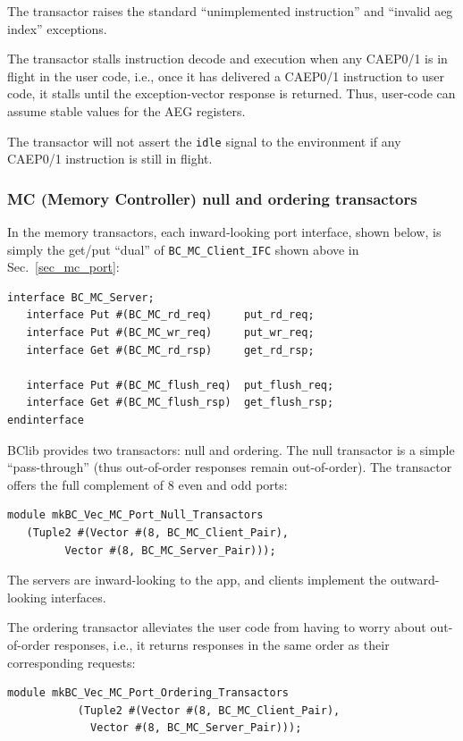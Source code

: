 \documentclass[twoside,letterpaper,11pt]{article}
\begin{document}
The transactor raises the standard ``unimplemented instruction'' and
``invalid aeg index'' exceptions.

The transactor stalls instruction decode and execution when any
CAEP0/1 is in flight in the user code, i.e., once it has delivered a
CAEP0/1 instruction to user code, it stalls until the exception-vector
response is returned.  Thus, user-code can assume stable values for
the AEG registers.

The transactor will not assert the \verb|idle| signal to the
environment if any CAEP0/1 instruction is still in flight.


\subsubsection{MC (Memory Controller) null and ordering transactors}

\label{sec_mc_transactors}

In the memory transactors, each inward-looking port interface, shown
below, is simply the get/put ``dual'' of \verb|BC_MC_Client_IFC| shown
above in Sec.~\ref{sec_mc_port}:
\begin{Verbatim}[frame=single, label=BC\_Transactors.bsv]
interface BC_MC_Server;
   interface Put #(BC_MC_rd_req)     put_rd_req;
   interface Put #(BC_MC_wr_req)     put_wr_req;
   interface Get #(BC_MC_rd_rsp)     get_rd_rsp;

   interface Put #(BC_MC_flush_req)  put_flush_req;
   interface Get #(BC_MC_flush_rsp)  get_flush_rsp;
endinterface
\end{Verbatim}

BClib provides two transactors: null and ordering.  The null
transactor is a simple ``pass-through'' (thus out-of-order responses
remain out-of-order).  The transactor offers the full complement of 8
even and odd ports:
\begin{Verbatim}[frame=single, label=BC\_Transactors.bsv] 
module mkBC_Vec_MC_Port_Null_Transactors
   (Tuple2 #(Vector #(8, BC_MC_Client_Pair),
	     Vector #(8, BC_MC_Server_Pair)));
\end{Verbatim}
The servers are inward-looking to the app, and clients implement the
outward-looking interfaces.

The ordering transactor alleviates the user code from having to worry
about out-of-order responses, i.e., it returns responses in the same
order as their corresponding requests:
\begin{Verbatim}[frame=single, label=BC\_Transactors.bsv]
module mkBC_Vec_MC_Port_Ordering_Transactors
           (Tuple2 #(Vector #(8, BC_MC_Client_Pair),
		     Vector #(8, BC_MC_Server_Pair)));
\end{Verbatim}
\end{document}
